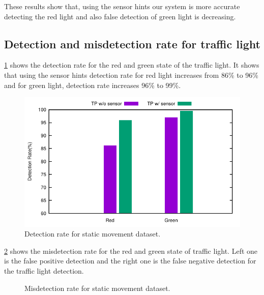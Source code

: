 These results show that, using the sensor hints our system is more accurate detecting the red light and also false detection of green light is decreasing.

\subsection{Detection and misdetection rate for traffic light}

\ref{f:tp_stat} shows the detection rate for the red and green state of the traffic light.
It shows that using the sensor hints detection rate for red light increases from 86\% to 96\% and for green light, detection rate increases 96\% to 99\%.

\begin{figure}[h!]
\centering
\includegraphics[width=5.2in]{plots/bar_tp.pdf}
\caption{Detection rate for static movement dataset.}
\label{f:tp_stat}
\end{figure}

\ref{f:fp_stat} shows the misdetection rate for the red and green state of traffic light.
Left one is the false positive detection and the right one is the false negative detection for the traffic light detection.

\begin{figure}[!ht]
\centering
{}
\hfill
{}
\caption{Misdetection rate for static movement dataset.}
\label{f:fp_stat}
\end{figure}

